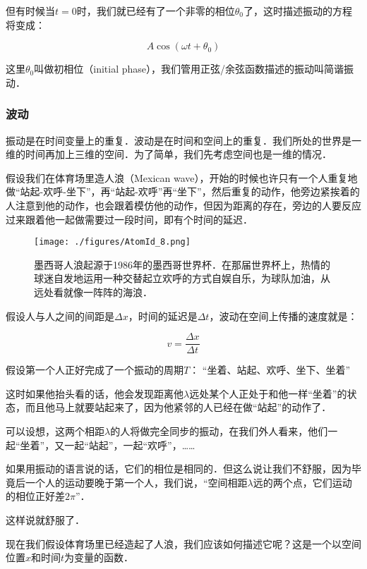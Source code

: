 但有时候当$t = 0$时，我们就已经有了一个非零的相位$\theta_0$了，这时描述振动的方程将变成：

\begin{equation}
A \cos (\omega t + \theta_0)
\end{equation}

这里$\theta_0$叫做初相位（initial phase），我们管用正弦/余弦函数描述的振动叫简谐振动．


\subsubsection{波动}

振动是在时间变量上的重复．波动是在时间和空间上的重复．我们所处的世界是一维的时间再加上三维的空间．为了简单，我们先考虑空间也是一维的情况．

假设我们在体育场里造人浪（Mexican wave），开始的时候也许只有一个人重复地做“站起-欢呼-坐下”，再“站起-欢呼”再“坐下”，然后重复的动作，他旁边紧挨着的人注意到他的动作，也会跟着模仿他的动作，但因为距离的存在，旁边的人要反应过来跟着他一起做需要过一段时间，即有个时间的延迟．

\begin{figure}[ht]
\centering
\texttt{[image: ./figures/AtomId\_8.png]}
\caption{墨西哥人浪起源于1986年的墨西哥世界杯．在那届世界杯上，热情的球迷自发地运用一种交替起立欢呼的方式自娱自乐，为球队加油，从远处看就像一阵阵的海浪．} \label{AtomId_fig8}
\end{figure}


假设人与人之间的间距是$\Delta x$，时间的延迟是$\Delta t$，波动在空间上传播的速度就是：

\begin{equation}
v = \frac{\Delta x }{\Delta t}
\end{equation}

假设第一个人正好完成了一个振动的周期$T$： “坐着、站起、欢呼、坐下、坐着”

这时如果他抬头看的话，他会发现距离他$\lambda$远处某个人正处于和他一样“坐着”的状态，而且他马上就要站起来了，因为他紧邻的人已经在做“站起”的动作了．

可以设想，这两个相距$\lambda$的人将做完全同步的振动，在我们外人看来，他们一起“坐着”，又一起“站起”，一起“欢呼”，……

如果用振动的语言说的话，它们的相位是相同的．但这么说让我们不舒服，因为毕竟后一个人的运动要晚于第一个人，我们说，“空间相距$\lambda$远的两个点，它们运动的相位正好差$2 \pi$”．


这样说就舒服了．

现在我们假设体育场里已经造起了人浪，我们应该如何描述它呢？这是一个以空间位置$x$和时间$t$为变量的函数．

